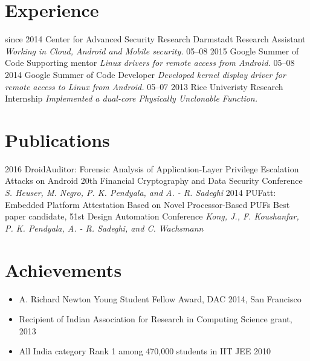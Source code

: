 \documentclass[]{friggeri-cv}
\begin{document}
\section{Experience}

\begin{entrylist}
  \entry
    {since 2014}
    {Center for Advanced Security Research Darmstadt}
    {Research Assistant}
    {\emph{Working in Cloud, Android and Mobile security.}}
  \entry
    {05–08 2015}
    {Google Summer of Code}
    {Supporting mentor}
    {\emph{Linux drivers for remote access from Android.}}
  \entry
    {05–08 2014}
    {Google Summer of Code}
    {Developer}
    {\emph{Developed kernel display driver for remote access to Linux from Android.}}
  \entry
    {05–07 2013}
    {Rice Univeristy}
    {Research Internship}
    {\emph{Implemented a dual-core Physically Unclonable Function.}}
\end{entrylist}

\section{Publications}
\begin{entrylist}
  \entry
    {2016}
    {DroidAuditor: Forensic Analysis of Application-Layer Privilege Escalation Attacks on Android}
    {20th Financial Cryptography and Data Security Conference}
    {\emph{S. Heuser, M. Negro, P. K. Pendyala, and A. - R. Sadeghi}}
  \entry
    {2014}
    {PUFatt: Embedded Platform Attestation Based on Novel Processor-Based PUFs}
    {Best paper candidate, 51st Design Automation Conference}
    {\emph{Kong, J., F. Koushanfar, P. K. Pendyala, A. - R. Sadeghi, and C. Wachsmann}}
\end{entrylist}

\section{Achievements}
\begin{itemize}
  \item A. Richard Newton Young Student Fellow Award, DAC 2014, San Francisco
  \item Recipient of Indian Association for Research in Computing Science grant, 2013
  \item All India category Rank 1 among 470,000 students in IIT JEE 2010
\end{itemize}
~
\end{document}
